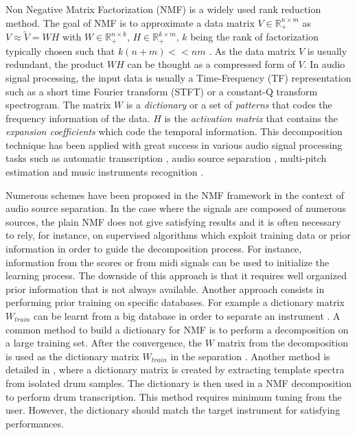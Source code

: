 \documentclass[journal]{IEEEtran}
\begin{document}
Non Negative Matrix Factorization (NMF) is a widely used rank reduction method. The goal of NMF is to approximate a data matrix $V \in \mathbb{R}_{+}^{n \times m} $ as $V \approx \tilde{V} = WH$ with $W \in \mathbb{R}_{+}^{n \times k}$, $H \in \mathbb{R}_{+}^{k \times m}$, $k$ being the rank of factorization typically chosen such that \mbox{$k(n+m) << nm  $} \cite{lee99}. As the data matrix $V$ is usually redundant, the product $WH$ can be thought as a compressed form of $V$. In audio signal processing, the input data is usually a Time-Frequency (TF) representation such as a short time Fourier transform (STFT) or a constant-Q transform spectrogram. The matrix $W$ is a {\em dictionary} or a set of {\em patterns} that codes the frequency information of the data. $H$ is the {\em activation matrix} that contains the {\em expansion coefficients} which code the temporal information.
This decomposition technique has been applied with great success in various audio signal processing tasks such as automatic transcription \cite{EwertM12,NB:ICASSP-07}, audio source separation \cite{HennequinDAFx2010,JLD:TASLP10}, multi-pitch estimation \cite{raczynski2007multipitch} and music instruments recognition \cite{cichocki2009nonnegative}.

Numerous schemes have been proposed in the NMF framework in the context of audio source separation. In the case where the signals are composed of numerous sources, the plain NMF does not give satisfying results and it is often necessary to rely, for instance, on supervised algorithms which exploit training data or prior information in order to guide the decomposition process. For instance, information from the scores or from midi signals \cite{EwertM12} can be used to initialize the learning process. The downside of this approach is that it requires well organized prior information that is not always available. Another approach consists in performing prior training on specific databases. For example a dictionary matrix $W_{train}$ can be learnt from a big database in order to separate an instrument \cite{jaureguiberry2011adaptation,wudrum}. A common method to build a dictionary for NMF is to perform a decomposition on a large training set. After the convergence, the $W$ matrix from the decomposition is used as the dictionary matrix $W_{train}$ in the separation \cite{jaureguiberry2011adaptation}. Another method is detailed in \cite{wudrum}, where a dictionary matrix is created by extracting template spectra from isolated drum samples. The dictionary is then used in a NMF decomposition to perform drum transcription. This method requires minimum tuning from the user. However, the dictionary should match the target instrument for satisfying performances. 
\end{document}
